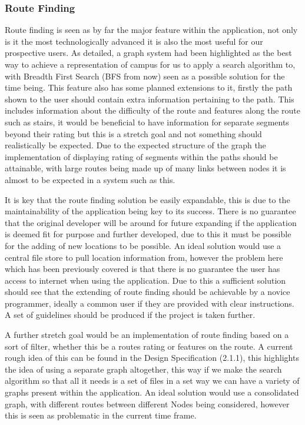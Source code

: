 \subsubsection{Route Finding}
Route finding is seen as by far the major feature within the application, not only is it the most technologically advanced it is also the most useful for our prospective users. As detailed, a graph system had been highlighted as the best way to achieve a representation of campus for us to apply a search algorithm to, with Breadth First Search (BFS from now) seen as a possible solution for the time being. This feature also has some planned extensions to it, firstly the path shown to the user should contain extra information pertaining to the path. This includes information about the difficulty of the route and features along the route such as stairs, it would be beneficial to have information for separate segments beyond their rating but this is a stretch goal and not something should realistically be expected. Due to the expected structure of the graph the implementation of displaying rating of segments within the paths should be attainable, with large routes being made up of many links between nodes it is almost to be expected in a system such as this. 

It is key that the route finding solution be easily expandable, this is due to the maintainability of the application being key to its success. There is no guarantee that the original developer will be around for future expanding if the application is deemed fit for purpose and further developed, due to this it must be possible for the adding of new locations to be possible. An ideal solution would use a central file store to pull location information from, however the problem here which has been previously covered is that there is no guarantee the user has access to internet when using the application. Due to this a sufficient solution should see that the extending of route finding should be achievable by a novice programmer, ideally a common user if they are provided with clear instructions. A set of guidelines should be produced if the project is taken further. 

A further stretch goal would be an implementation of route finding based on a sort of filter, whether this be a routes rating or features on the route. A current rough idea of this can be found in the Design Specification (2.1.1), this highlights the idea of using a separate graph altogether, this way if we make the search algorithm so that all it needs is a set of files in a set way we can have a variety of graphs present within the application. An ideal solution would use a consolidated graph, with different routes between different Nodes being considered, however this is seen as problematic in the current time frame. 

